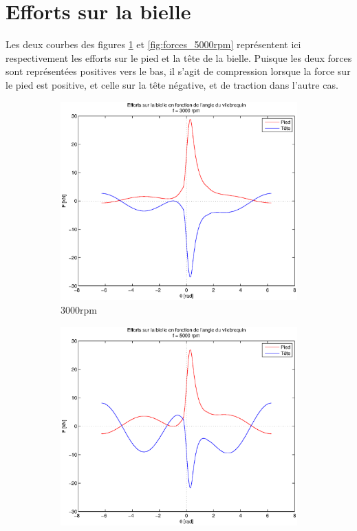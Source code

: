 \documentclass{article}
\begin{document}
\section{Efforts sur la bielle}

Les deux courbes des figures \ref{fig:forces_3000rpm} et \ref{fig:forces_5000rpm} représentent ici respectivement les efforts sur le pied et la tête de la bielle. Puisque les deux forces sont représentées positives vers le bas, il s'agit de compression lorsque la force sur le pied est positive, et celle sur la tête négative, et de traction dans l'autre cas. 

\begin{figure}[h]
\centering
    \begin{subfigure}[b]{0.45\textwidth}
    				\includegraphics[scale=0.4]{Schema/forces_3000rpm.eps}
                \caption{\unit{3000}{rpm}}
                \label{fig:forces_3000rpm}
    \end{subfigure}
    \begin{subfigure}[b]{0.45\textwidth}
        			\includegraphics[scale=0.4]{Schema/forces_5000rpm.eps}

\end{subfigure}
\end{figure}
\end{document}
